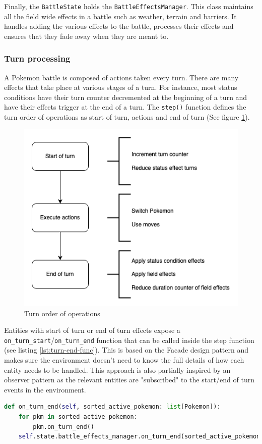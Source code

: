 Finally, the \lstinline|BattleState| holds the \lstinline|BattleEffectsManager|. This class maintains all the field wide
effects in a battle such as weather, terrain and barriers. It handles adding the various effects to the battle, processes
their effects and ensures that they fade away when they are meant to.

\subsubsection{Turn processing}
A Pokemon battle is composed of actions taken every turn. There are many effects that take place at various stages of a turn.
For instance, most status conditions have their turn counter decremented at the beginning of a turn and have their effects trigger at
the end of a turn. The \lstinline|step()| function defines the turn order of operations as start of turn, actions and end
of turn (See figure \ref{fig:turn-order-of-operations}). 
\begin{figure}[h]
    \centering
    \includegraphics[width=.9\textwidth]{assets/turn-order-of-operations.png}
    \caption{Turn order of operations}
    \label{fig:turn-order-of-operations}
\end{figure}
Entities with start of turn or end of turn effects expose a \lstinline|on_turn_start|/\lstinline|on_turn_end| function 
that can be called inside the step function (see listing \ref{lst:turn-end-func}). This is based on
the Facade design pattern and makes sure the environment doesn't need to know the full details of how each entity needs
to be handled. This approach is also partially inspired by an observer pattern as the relevant entities are "subscribed"
to the start/end of turn events in the environment.
\begin{lstlisting}[language=Python,caption={Example of the environment handling the end of a turn without knowing each entity's full implementation.},float=h,label=lst:turn-end-func,breaklines]
def on_turn_end(self, sorted_active_pokemon: list[Pokemon]):
    for pkm in sorted_active_pokemon:
        pkm.on_turn_end()
    self.state.battle_effects_manager.on_turn_end(sorted_active_pokemon)
\end{lstlisting}



